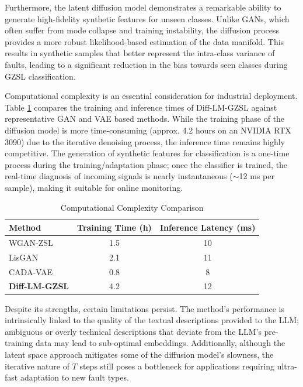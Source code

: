 \documentclass[journal]{IEEEtran}
\begin{document}
Furthermore, the latent diffusion model demonstrates a remarkable ability to generate high-fidelity synthetic features for unseen classes. Unlike GANs, which often suffer from mode collapse and training instability, the diffusion process provides a more robust likelihood-based estimation of the data manifold. This results in synthetic samples that better represent the intra-class variance of faults, leading to a significant reduction in the bias towards seen classes during GZSL classification.

Computational complexity is an essential consideration for industrial deployment. Table \ref{tab:time_complexity} compares the training and inference times of Diff-LM-GZSL against representative GAN and VAE based methods. While the training phase of the diffusion model is more time-consuming (approx. 4.2 hours on an NVIDIA RTX 3090) due to the iterative denoising process, the inference time remains highly competitive. The generation of synthetic features for classification is a one-time process during the training/adaptation phase; once the classifier is trained, the real-time diagnosis of incoming signals is nearly instantaneous ($\sim$12 ms per sample), making it suitable for online monitoring.

\begin{table}[ht]
\centering
\caption{Computational Complexity Comparison}
\label{tab:time_complexity}
\begin{tabular}{lcc}
\toprule
Method & Training Time (h) & Inference Latency (ms) \\ \midrule
WGAN-ZSL & 1.5 & 10 \\
LisGAN & 2.1 & 11 \\
CADA-VAE & 0.8 & 8 \\
\textbf{Diff-LM-GZSL} & 4.2 & 12 \\ \bottomrule
\end{tabular}
\end{table}

Despite its strengths, certain limitations persist. The method's performance is intrinsically linked to the quality of the textual descriptions provided to the LLM; ambiguous or overly technical descriptions that deviate from the LLM’s pre-training data may lead to sub-optimal embeddings. Additionally, although the latent space approach mitigates some of the diffusion model's slowness, the iterative nature of $T$ steps still poses a bottleneck for applications requiring ultra-fast adaptation to new fault types.
\end{document}
